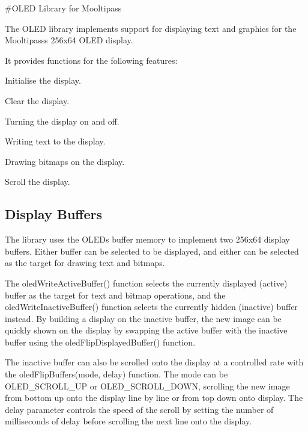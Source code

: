 \#\+O\+L\+ED Library for Mooltipass

The O\+L\+ED library implements support for displaying text and graphics for the Mooltipass\textquotesingle{}s 256x64 O\+L\+ED display.

It provides functions for the following features\+:
\begin{DoxyItemize}
\item Initialise the display.
\item Clear the display.
\item Turning the display on and off.
\item Writing text to the display.
\item Drawing bitmaps on the display.
\item Scroll the display.
\end{DoxyItemize}

\subsection*{Display Buffers}

The library uses the O\+L\+ED\textquotesingle{}s buffer memory to implement two 256x64 display buffers. Either buffer can be selected to be displayed, and either can be selected as the target for drawing text and bitmaps.

The oled\+Write\+Active\+Buffer() function selects the currently displayed (active) buffer as the target for text and bitmap operations, and the oled\+Write\+Inactive\+Buffer() function selects the currently hidden (inactive) buffer instead. By building a display on the inactive buffer, the new image can be quickly shown on the display by swapping the active buffer with the inactive buffer using the oled\+Flip\+Displayed\+Buffer() function.

The inactive buffer can also be scrolled onto the display at a controlled rate with the oled\+Flip\+Buffers(mode, delay) function. The mode can be O\+L\+E\+D\+\_\+\+S\+C\+R\+O\+L\+L\+\_\+\+UP or O\+L\+E\+D\+\_\+\+S\+C\+R\+O\+L\+L\+\_\+\+D\+O\+WN, scrolling the new image from bottom up onto the display line by line or from top down onto display. The delay parameter controls the speed of the scroll by setting the number of milliseconds of delay before scrolling the next line onto the display. 